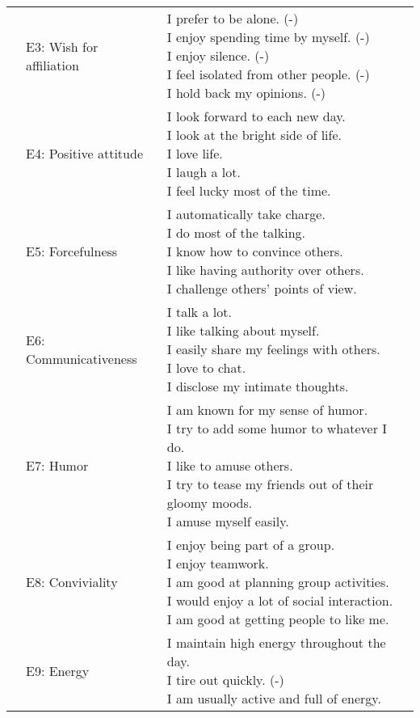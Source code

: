 \documentclass[]{article}
\begin{document}
\begin{longtable}[t]{lll}
\addlinespace
 & E3: Wish for affiliation & \makecell[l]{I prefer to be alone. (-)\\I enjoy spending time by myself. (-)\\I enjoy silence. (-)\\I feel isolated from other people. (-)\\I hold back my opinions. (-)}\\
\addlinespace
 & E4: Positive attitude & \makecell[l]{I look forward to each new day.\\I look at the bright side of life.\\I love life.\\I laugh a lot.\\I feel lucky most of the time.}\\
\addlinespace
 & E5: Forcefulness & \makecell[l]{I automatically take charge.\\I do most of the talking.\\I know how to convince others.\\I like having authority over others.\\I challenge others’ points of view.}\\
\addlinespace
 & E6: Communicativeness & \makecell[l]{I talk a lot.\\I like talking about myself.\\I easily share my feelings with others.\\I love to chat.\\I disclose my intimate thoughts.}\\
\addlinespace
 & E7: Humor & \makecell[l]{I am known for my sense of humor.\\I try to add some humor to whatever I do.\\I like to amuse others.\\I try to tease my friends out of their gloomy moods.\\I amuse myself easily.}\\
\addlinespace
 & E8: Conviviality & \makecell[l]{I enjoy being part of a group.\\I enjoy teamwork.\\I am good at planning group activities.\\I would enjoy a lot of social interaction.\\I am good at getting people to like me.}\\
\addlinespace
 & E9: Energy & \makecell[l]{I maintain high energy throughout the day.\\I tire out quickly. (-)\\I am usually active and full of energy.}\\

\end{longtable}
\end{document}
